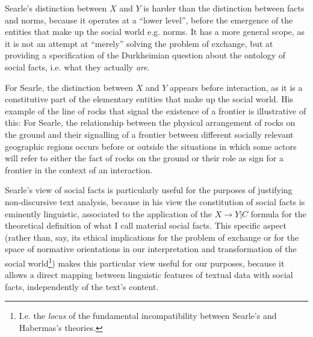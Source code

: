 Searle's distinction between $X$ and $Y$ is harder than the distinction between facts and norms, because it operates at a ``lower level'', before the emergence of the entities that make up the social world e.g. norms.
It has a more general scope, as it is not an attempt at ``merely'' solving the problem of exchange, but at providing a specification of the Durkheimian question about the ontology of social facts, i.e. what they actually \emph{are}.

For Searle, the distinction between $X$ and $Y$ appears before interaction, as it is a constitutive part of the elementary entities that make up the social world.
His example of the line of rocks that signal the existence of a frontier
is illustrative of this:
For Searle, the relationship between the physical arrangement of rocks on the ground and their signalling of a frontier between different socially relevant geographic regions occurs before or outside the situations in which some actors will refer to either the fact of rocks on the ground or their role as sign for a frontier in the context of an interaction.

Searle's view of social facts is particularly useful for the purposes of justifying non-discursive text analysis, because in his view the constitution of social facts is eminently linguistic, associated to the application of the $X \rightarrow Y | C$ formula for the theoretical definition of what I call material social facts.
This specific aspect (rather than, say, its ethical implications for the problem of exchange or for the space of normative orientations in our interpretation and transformation of the social world\footnote{
    I.e. the \emph{locus} of the fundamental incompatibility between Searle's and Habermas's theories.
}) makes this particular view useful for our purposes, because it allows a direct mapping between linguistic features of textual data with social facts, independently of the text's content.

